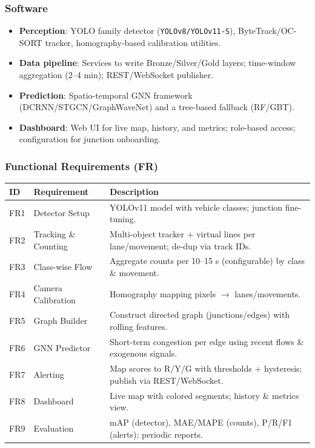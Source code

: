 \subsubsection{Software}
\begin{itemize}
  \item \textbf{Perception}: YOLO family detector (\texttt{YOLOv8/YOLOv11-S}), ByteTrack/OC-SORT tracker, homography-based calibration utilities.
  \item \textbf{Data pipeline}: Services to write Bronze/Silver/Gold layers; time-window aggregation (2--4 min); REST/WebSocket publisher.
  \item \textbf{Prediction}: Spatio-temporal GNN framework (DCRNN/STGCN/GraphWaveNet) and a tree-based fallback (RF/GBT).
  \item \textbf{Dashboard}: Web UI for live map, history, and metrics; role-based access; configuration for junction onboarding.
\end{itemize}

\subsubsection{Functional Requirements (FR)}
\renewcommand{\arraystretch}{1.15}
\begin{tabularx}{\textwidth}{|>{\raggedright\arraybackslash}p{1.1cm}|>{\raggedright\arraybackslash}p{3.2cm}|>{\raggedright\arraybackslash}X|}
\hline
	\textbf{ID} & \textbf{Requirement} & \textbf{Description} \\
\hline
FR1 & Detector Setup & YOLOv11 model with vehicle classes; junction fine-tuning. \\
\hline
FR2 & Tracking \& Counting & Multi-object tracker + virtual lines per lane/movement; de-dup via track IDs. \\
\hline
FR3 & Class-wise Flow & Aggregate counts per 10--15 s (configurable) by class \& movement. \\
\hline
FR4 & Camera Calibration & Homography mapping pixels $\rightarrow$ lanes/movements. \\
\hline
FR5 & Graph Builder & Construct directed graph (junctions/edges) with rolling features. \\
\hline
FR6 & GNN Predictor & Short-term congestion per edge using recent flows \& exogenous signals. \\
\hline
FR7 & Alerting & Map scores to R/Y/G with thresholds + hysteresis; publish via REST/WebSocket. \\
\hline
FR8 & Dashboard & Live map with colored segments; history \& metrics view. \\
\hline
FR9 & Evaluation & mAP (detector), MAE/MAPE (counts), P/R/F1 (alerts); periodic reports. \\
\hline
\end{tabularx}

